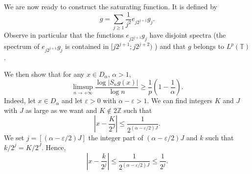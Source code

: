 \documentclass[11pt,a4paper]{amsart}
\theoremstyle{plain}
\begin{document}
We are now ready to construct the saturating function. It is defined by
$$g=\sum_{j\geq 1}\frac1{j^2}e_{j2^{j+1}}g_j.$$
Observe in particular that the functions 
$e_{j2^{j+1}}g_j$ have disjoint spectra (the spectrum of $e_{j2^{j+1}}g_j$ is 
contained in $[j2^{j+1};j2^{j+2})$ ) and that $g$ belongs to $L^p({\mathbb T})$.

We then show that for any $x\in D_\alpha$, $\alpha>1$,
$$\displaystyle\limsup_{n\to+\infty}\frac{\log |S_ng(x)|}{\log
  n}\geq\frac1p\left(1-\frac1\alpha\right).$$ 
Indeed, let $x\in D_\alpha$
and let ${\varepsilon}>0$ with $\alpha-{\varepsilon}>1$. We can find integers $K$ and $J$ with
$J$ as large as we want and $K\notin 2\mathbb Z$ such that
$$\left|x-\frac{K}{2^J}\right|\leq\frac1{2^{(\alpha-{\varepsilon}/2)J}}.$$
We set $j=[(\alpha-{\varepsilon}/2)J]$ the integer part of  $(\alpha-{\varepsilon}/2)J$  and $k$ such that $k/2^j=K/2^J$. Hence, 
$$\left|x-\frac{k}{2^j}\right|\leq\frac{1}{2^{(\alpha-{\varepsilon}/2)J}}\leq \frac{1}{2^{j}}.$$
\end{document}
